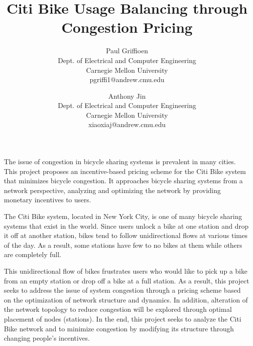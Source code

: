 \documentclass[times, 10pt,twocolumn]{article}
\begin{document}
\title{Citi Bike Usage Balancing through Congestion Pricing}

\author{Paul Griffioen\\Dept. of Electrical and Computer Engineering\\Carnegie Mellon University\\ pgriffi1@andrew.cmu.edu\\
\and
Anthony Jin\\Dept. of Electrical and Computer Engineering\\Carnegie Mellon University\\xiaoxiaj@andrew.cmu.edu\\
}

\maketitle
\thispagestyle{empty}


The issue of congestion in bicycle sharing systems is prevalent in many cities. This project proposes an incentive-based pricing scheme for the Citi Bike system that minimizes bicycle congestion. It approaches bicycle sharing systems from a network perspective, analyzing and optimizing the network by providing monetary incentives to users.


The Citi Bike system, located in New York City, is one of many bicycle sharing systems that exist in the world. Since users unlock a bike at one station and drop it off at another station, bikes tend to follow unidirectional flows at various times of the day. As a result, some stations have few to no bikes at them while others are completely full.

This unidirectional flow of bikes frustrates users who would like to pick up a bike from an empty station or drop off a bike at a full station. As a result, this project seeks to address the issue of system congestion through a pricing scheme based on the optimization of network structure and dynamics. In addition, alteration of the network topology to reduce congestion will be explored through optimal placement of nodes (stations). In the end, this project seeks to analyze the Citi Bike network and to minimize congestion by modifying its structure through changing people's incentives.
\end{document}
